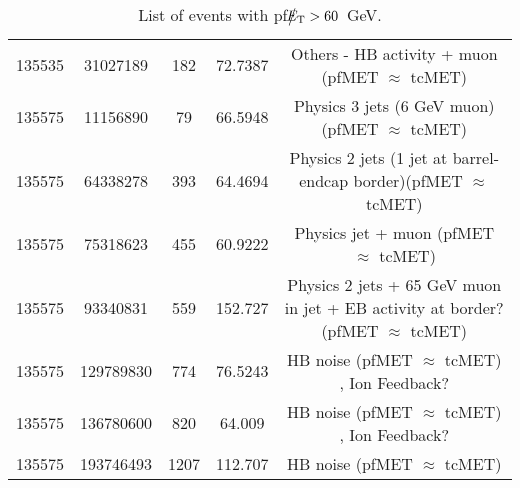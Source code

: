 \begin{table}[htbp]
\begin{center}
\begin{tabular}{|c|c|c|c|c|}
      135535 & 31027189    &  182  &    72.7387  & Others - HB activity + muon (pfMET $\approx$ tcMET) \\
      135575 & 11156890    &  79   &    66.5948  & Physics 3 jets (6 GeV muon) (pfMET $\approx$ tcMET) \\ 
      135575 & 64338278    &  393  &    64.4694  & Physics 2 jets (1 jet at barrel-endcap border)(pfMET $\approx$ tcMET) \\ 
      135575 & 75318623    &  455  &    60.9222  & Physics jet + muon (pfMET $\approx$ tcMET) \\
      135575 & 93340831    &  559  &    152.727  & Physics 2 jets + 65 GeV muon in jet + EB activity at border? (pfMET $\approx$ tcMET) \\ 
      135575 & 129789830   &  774  &    76.5243  & HB noise (pfMET $\approx$ tcMET) , Ion Feedback? \\
      135575 & 136780600   &  820  &    64.009   & HB noise (pfMET $\approx$ tcMET) , Ion Feedback? \\
      135575 & 193746493   &  1207 &    112.707  & HB noise (pfMET $\approx$ tcMET) \\
      \hline
    \end{tabular}
    \caption{List of events with pf$\big\slash\hspace{-1.6ex}{E_\text{T}}>60$~GeV.}        
    \label{tab:pfMETlist1}
  \end{center}
\end{table}

